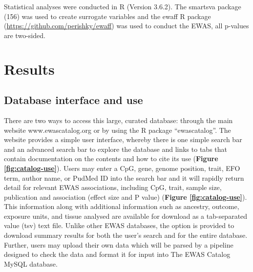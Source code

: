 \documentclass[11pt,twoside]{bristolthesis}
\begin{document}
Statistical analyses were conducted in R (Version 3.6.2). The smartsva package (156) was used to create surrogate variables and the ewaff R package (\url{https://github.com/perishky/ewaff}) was used to conduct the EWAS, all p-values are two-sided.

\hypertarget{results-03}{%
\section{Results}\label{results-03}}

\hypertarget{database-interface-and-use}{%
\subsection{Database interface and use}\label{database-interface-and-use}}

There are two ways to access this large, curated database: through the main website www.ewascatalog.org or by using the R package ``ewascatalog''. The website provides a simple user interface, whereby there is one simple search bar and an advanced search bar to explore the database and links to tabs that contain documentation on the contents and how to cite its use (\textbf{Figure \ref{fig:catalog-use}}). Users may enter a CpG, gene, genome position, trait, EFO term, author name, or PudMed ID into the search bar and it will rapidly return detail for relevant EWAS associations, including CpG, trait, sample size, publication and association (effect size and P value) (\textbf{Figure \ref{fig:catalog-use}}). This information along with additional information such as ancestry, outcome, exposure units, and tissue analysed are available for download as a tab-separated value (tsv) text file. Unlike other EWAS databases, the option is provided to download summary results for both the user's search and for the entire database. Further, users may upload their own data which will be parsed by a pipeline designed to check the data and format it for input into The EWAS Catalog MySQL database.
\end{document}
